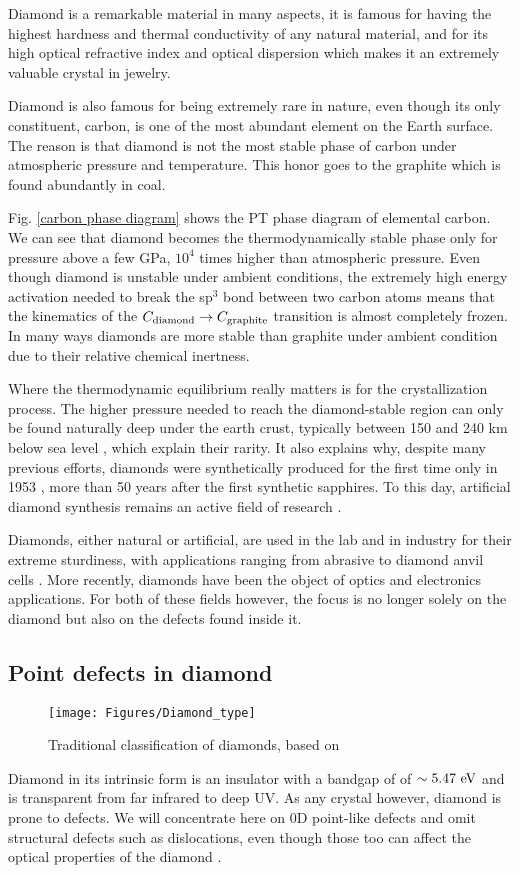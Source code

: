 \documentclass[a4paper,11pt]{report}
\begin{document}
Diamond is a remarkable material in many aspects, it is famous for having the highest hardness and thermal conductivity of any natural material, and for its high optical refractive index and optical dispersion which makes it an extremely valuable crystal in jewelry.

Diamond is also famous for being extremely rare in nature, even though its only constituent, carbon, is one of the most abundant element on the Earth surface. The reason is that diamond is not the most stable phase of carbon under atmospheric pressure and temperature. This honor goes to the graphite which is found abundantly in coal. 

Fig. \ref{carbon phase diagram} shows the PT phase diagram of elemental carbon. We can see that diamond becomes the thermodynamically stable phase only for pressure above a few GPa, $10^4$ times higher than atmospheric pressure. Even though diamond is unstable under ambient conditions, the extremely high energy activation needed to break the sp$^3$ bond between two carbon atoms means that the kinematics of the $C_{\rm diamond} \to C_{\rm graphite}$ transition is almost completely frozen. In many ways diamonds are more stable than graphite under ambient condition due to their relative chemical inertness.

Where the thermodynamic equilibrium really matters is for the crystallization process. The higher pressure needed to reach the diamond-stable region can only be found naturally deep under the earth crust, typically between 150 and 240 km below sea level \citep{tappert2011diamonds}, which explain their rarity. It also explains why, despite many previous efforts, diamonds were synthetically produced for the first time only in 1953 \citep{barnard2000diamond}, more than 50 years after the first synthetic sapphires. To this day, artificial diamond synthesis remains an active field of research \citep{shenderova2019synthesis, achard2020chemical}.

Diamonds, either natural or artificial, are used in the lab and in industry for their extreme sturdiness, with applications ranging from abrasive to diamond anvil cells \citep{jayaraman1983diamond}. More recently, diamonds have been the object of optics and electronics applications. For both of these fields however, the focus is no longer solely on the diamond but also on the defects found inside it.

\subsection{Point defects in diamond}
\begin{figure}[h!]
\centering
\texttt{[image: Figures/Diamond\_type]}
\caption{Traditional classification of diamonds, based on \citep{tappert2011diamonds}}
\label{diamond type}
\end{figure}
Diamond in its intrinsic form is an insulator with a bandgap of of $\sim 5.47\ \rm eV$ and is transparent from far infrared to deep UV. As any crystal however, diamond is prone to defects. We will concentrate here on 0D point-like defects and omit structural defects such as dislocations, even though those too can affect the optical properties of the diamond \citep{collins2000colour}. 
\end{document}
